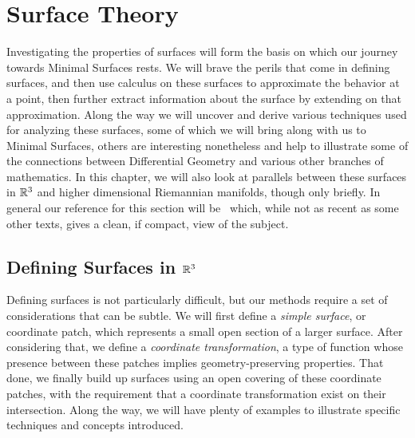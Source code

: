 \section{Surface Theory}

  Investigating the properties of surfaces will form the basis on which our journey towards Minimal Surfaces rests. We will brave the perils that come in defining surfaces, and then use calculus on these surfaces to approximate the behavior at a point, then further extract information about the surface by extending on that approximation. Along the way we will uncover and derive various techniques used for analyzing these surfaces, some of which we will bring along with us to Minimal Surfaces, others are interesting nonetheless and help to illustrate some of the connections between Differential Geometry and various other branches of mathematics. In this chapter, we will also look at parallels between these surfaces in $\mathbb{R}^3$ and higher dimensional Riemannian manifolds, though only briefly. In general our reference for this section will be~\cite{MP77} which, while not as recent as some other texts, gives a clean, if compact, view of the subject.

\subsection{Defining Surfaces in $\mathbb{R}^3$}

  Defining surfaces is not particularly difficult, but our methods require a set of considerations that can be subtle. We will first define a \emph{simple surface}, or coordinate patch, which represents a small open section of a larger surface. After considering that, we define a \emph{coordinate transformation}, a type of function whose presence between these patches implies geometry-preserving properties. That done, we finally build up surfaces using an open covering of these coordinate patches, with the requirement that a coordinate transformation exist on their intersection. Along the way, we will have plenty of examples to illustrate specific techniques and concepts introduced.


